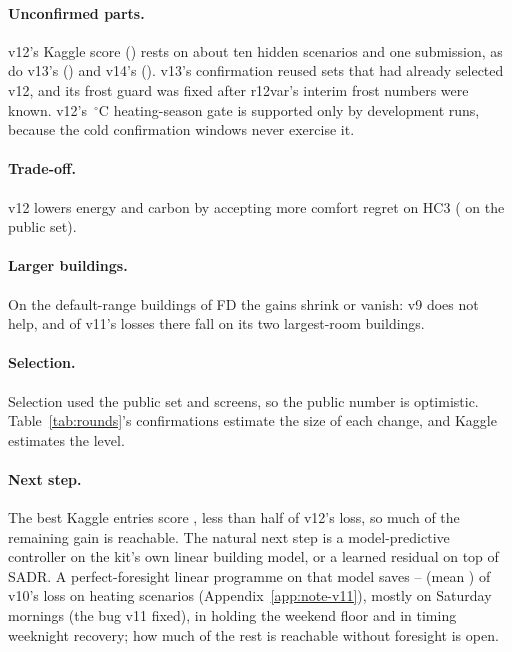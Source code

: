 \documentclass{article}
\begin{document}
\paragraph{Unconfirmed parts.} v12's Kaggle score (\RTenKagVTwelve) rests on about ten hidden scenarios and one submission, as do v13's (\RTwKagVThirteen) and v14's (\RFtKagVFourteen). v13's confirmation reused sets that had already selected v12, and its frost guard was fixed after r12var's interim frost numbers were known. v12's \RTenSeasonOatC\,$^\circ$C heating-season gate is supported only by development runs, because the cold confirmation windows never exercise it.

\paragraph{Trade-off.} v12 lowers energy and carbon by accepting \RTenComfRiseHCThree{} more comfort regret on HC3 (\RTenComfRisePub{} on the public set).

\paragraph{Larger buildings.} On the default-range buildings of FD the gains shrink or vanish: v9 does not help, and \RNineFDTopTwoLosses{} of v11's \RNineConfFreshDefLosses{} losses there fall on its two largest-room buildings.

\paragraph{Selection.} Selection used the public set and screens, so the public number is optimistic. Table~\ref{tab:rounds}'s confirmations estimate the size of each change, and Kaggle estimates the level.

\paragraph{Next step.} The best Kaggle entries score \RElvKagBest{}, less than half of v12's loss, so much of the remaining gain is reachable. The natural next step is a model-predictive controller on the kit's own linear building model, or a learned residual on top of SADR. A perfect-foresight linear programme on that model saves \RElvLpMin--\RElvLpMax{} (mean \RElvLpMean) of v10's loss on \RElvLpN{} heating scenarios (Appendix~\ref{app:note-v11}), mostly on Saturday mornings (the bug v11 fixed), in holding the weekend floor and in timing weeknight recovery; how much of the rest is reachable without foresight is open.
\end{document}
